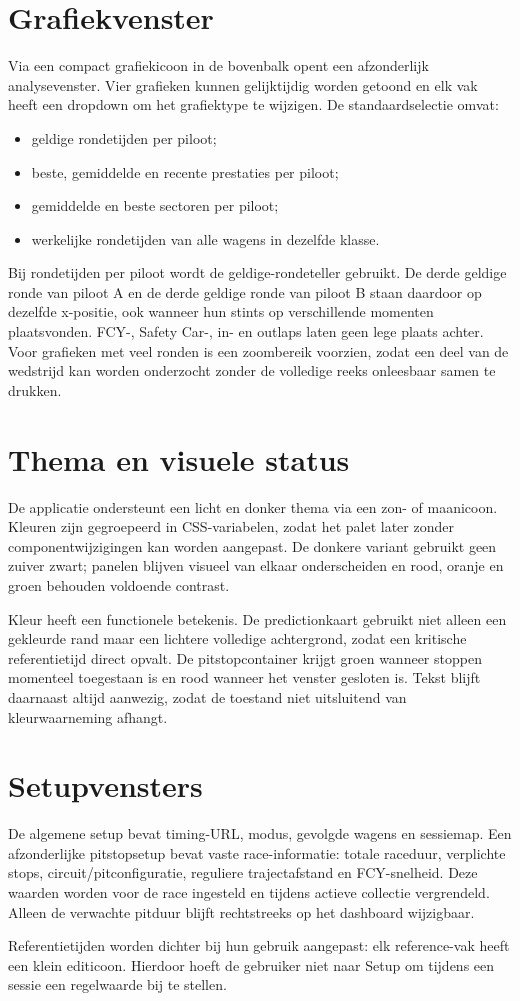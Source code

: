 \section{Grafiekvenster}
Via een compact grafiekicoon in de bovenbalk opent een afzonderlijk analysevenster. Vier grafieken kunnen gelijktijdig worden getoond en elk vak heeft een dropdown om het grafiektype te wijzigen. De standaardselectie omvat:

\begin{itemize}
  \item geldige rondetijden per piloot;
  \item beste, gemiddelde en recente prestaties per piloot;
  \item gemiddelde en beste sectoren per piloot;
  \item werkelijke rondetijden van alle wagens in dezelfde klasse.
\end{itemize}

Bij rondetijden per piloot wordt de geldige-rondeteller gebruikt. De derde geldige ronde van piloot A en de derde geldige ronde van piloot B staan daardoor op dezelfde x-positie, ook wanneer hun stints op verschillende momenten plaatsvonden. FCY-, Safety Car-, in- en outlaps laten geen lege plaats achter. Voor grafieken met veel ronden is een zoombereik voorzien, zodat een deel van de wedstrijd kan worden onderzocht zonder de volledige reeks onleesbaar samen te drukken.

\section{Thema en visuele status}
De applicatie ondersteunt een licht en donker thema via een zon- of maanicoon. Kleuren zijn gegroepeerd in CSS-variabelen, zodat het palet later zonder componentwijzigingen kan worden aangepast. De donkere variant gebruikt geen zuiver zwart; panelen blijven visueel van elkaar onderscheiden en rood, oranje en groen behouden voldoende contrast.

Kleur heeft een functionele betekenis. De predictionkaart gebruikt niet alleen een gekleurde rand maar een lichtere volledige achtergrond, zodat een kritische referentietijd direct opvalt. De pitstopcontainer krijgt groen wanneer stoppen momenteel toegestaan is en rood wanneer het venster gesloten is. Tekst blijft daarnaast altijd aanwezig, zodat de toestand niet uitsluitend van kleurwaarneming afhangt.

\section{Setupvensters}
De algemene setup bevat timing-URL, modus, gevolgde wagens en sessiemap. Een afzonderlijke pitstopsetup bevat vaste race-informatie: totale raceduur, verplichte stops, circuit/pitconfiguratie, reguliere trajectafstand en FCY-snelheid. Deze waarden worden voor de race ingesteld en tijdens actieve collectie vergrendeld. Alleen de verwachte pitduur blijft rechtstreeks op het dashboard wijzigbaar.

Referentietijden worden dichter bij hun gebruik aangepast: elk reference-vak heeft een klein editicoon. Hierdoor hoeft de gebruiker niet naar Setup om tijdens een sessie een regelwaarde bij te stellen.

